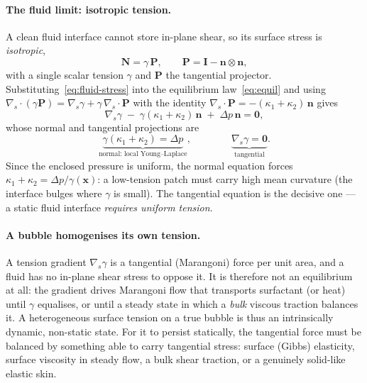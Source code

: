 \documentclass[11pt]{article}
\newcommand{\vv}[1]{\bm{#1}}          %
\newcommand{\nn}{\vv{n}}               %
\newcommand{\Nb}{\mathbf{N}}           %
\newcommand{\kone}{\kappa_1}
\newcommand{\ktwo}{\kappa_2}
\newcommand{\divs}{\nabla_{\!s}\!\cdot}
\begin{document}
\paragraph{The fluid limit: isotropic tension.}
A clean fluid interface cannot store in-plane shear, so its surface stress is
\emph{isotropic},
\begin{equation}
  \Nb = \gamma\,\mathbf P, \qquad \mathbf P = \mathbf I - \nn\otimes\nn,
  \label{eq:fluid-stress}
\end{equation}
with a single scalar tension $\gamma$ and $\mathbf P$ the tangential projector.
Substituting~\eqref{eq:fluid-stress} into the equilibrium
law~\eqref{eq:equil} and using
$\divs(\gamma\mathbf P)=\nabla_{\!s}\gamma+\gamma\,\divs\mathbf P$ with the
identity $\divs\mathbf P=-(\kone+\ktwo)\,\nn$ gives
\begin{equation}
  \nabla_{\!s}\gamma \;-\; \gamma(\kone+\ktwo)\,\nn \;+\; \Delta p\,\nn = \vv0,
  \label{eq:fluid-balance}
\end{equation}
whose normal and tangential projections are
\begin{equation}
  \underbrace{\gamma(\kone+\ktwo)=\Delta p}_{\text{normal: local Young--Laplace}},
  \qquad\qquad
  \underbrace{\nabla_{\!s}\gamma=\vv0}_{\text{tangential}}.
  \label{eq:fluid-projections}
\end{equation}
Since the enclosed pressure is uniform, the normal equation forces
$\kone+\ktwo=\Delta p/\gamma(\vv x)$: a low-tension patch must carry high mean
curvature (the interface bulges where $\gamma$ is small).  The tangential
equation is the decisive one --- a static fluid interface \emph{requires uniform
tension}.

\paragraph{A bubble homogenises its own tension.}
A tension gradient $\nabla_{\!s}\gamma$ is a tangential (Marangoni) force per
unit area, and a fluid has no in-plane shear stress to oppose it.  It is
therefore not an equilibrium at all: the gradient drives Marangoni flow that
transports surfactant (or heat) until $\gamma$ equalises, or until a steady
state in which a \emph{bulk} viscous traction balances it.  A heterogeneous
surface tension on a true bubble is thus an intrinsically dynamic, non-static
state.  For it to persist statically, the tangential force must be balanced by
something able to carry tangential stress: surface (Gibbs) elasticity, surface
viscosity in steady flow, a bulk shear traction, or a genuinely solid-like
elastic skin.
\end{document}
